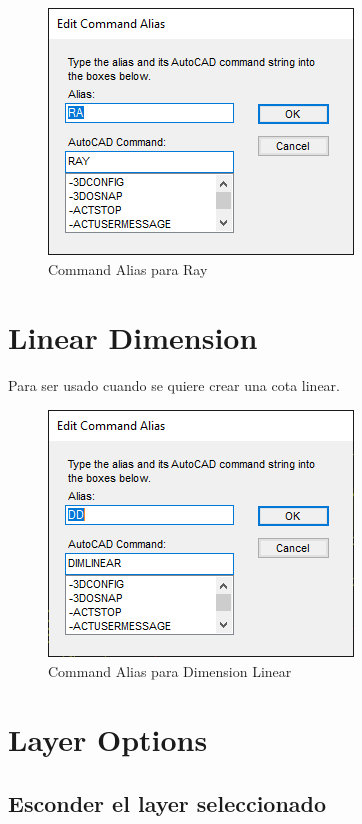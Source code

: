\documentclass[12pt,letterpaper,final]{report}
\begin{document}
\begin{figure}[H]
	\centering
	\includegraphics[width=0.55\linewidth, height=0.45\textheight,keepaspectratio]{Imagenes/autocad_alias_ray}
	\caption{Command Alias para Ray}
	\label{fig:autocadaliasray}
\end{figure}

\section{Linear Dimension}

Para ser usado cuando se quiere crear una cota linear.

\begin{figure}[H]
	\centering
	\includegraphics[width=0.55\linewidth, height=0.45\textheight,keepaspectratio]{Imagenes/autocad_alias_lineardimension}
	\caption{Command Alias para Dimension Linear}
	\label{fig:autocadaliaslineardimension}
\end{figure}



\section{Layer Options}

\subsection{Esconder el layer seleccionado}
\end{document}
